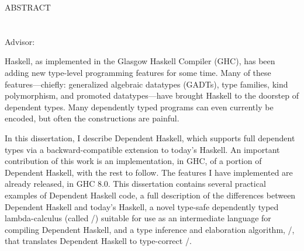 \begin{doublespace}

\begin{centering}
{\Large ABSTRACT} \\
\Title \\
\Author \\
Advisor: \Advisor \\
\end{centering}

\vspace*{1in}

Haskell, as implemented in the Glasgow Haskell Compiler (GHC), has been adding
new type-level programming features for some time. Many of these features---chiefly: generalized algebraic datatypes (GADTs), type families, kind
polymorphism, and promoted datatypes---have brought Haskell to the doorstep
of dependent types. Many dependently typed programs can even currently be
encoded, but often the constructions are painful.

In this dissertation, I describe Dependent Haskell, which supports full
dependent types via a backward-compatible extension to today's Haskell. An
important contribution of this work is an implementation, in GHC, of a
portion of Dependent
Haskell, with the rest to follow. The features I have implemented are already
released, in GHC 8.0.
This dissertation contains several practical examples of Dependent Haskell code,
a full description of the differences between
Dependent Haskell and today's Haskell, a novel type-safe dependently typed
lambda-calculus (called \pico/) suitable for use as an intermediate language
for compiling Dependent Haskell, and a type inference and elaboration
algorithm, \bake/, that translates Dependent Haskell to type-correct
\pico/.

\end{doublespace}

